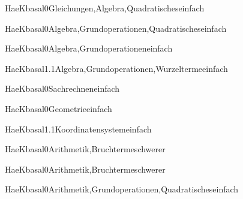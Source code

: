 \documentclass[12pt]{article}
\begin{document}
\begin{Add}{HaeK}{basal0}{Gleichungen,Algebra,Quadratisches}{einfach}
      
\end{Add}

\begin{Add}{HaeK}{basal0}{Algebra,Grundoperationen,Quadratisches}{einfach}
\end{Add}

\begin{Add}{HaeK}{basal0}{Algebra,Grundoperationen}{einfach}
\end{Add}

\begin{Add}{HaeK}{basal1.1}{Algebra,Grundoperationen,Wurzelterme}{einfach}
\end{Add}

\begin{Add}{HaeK}{basal0}{Sachrechnen}{einfach}
\end{Add}

\begin{Add}{HaeK}{basal0}{Geometrie}{einfach}
\end{Add}

\begin{Add}{HaeK}{basal1.1}{Koordinatensystem}{einfach}
\end{Add}

\begin{Add}{HaeK}{basal0}{Arithmetik,Bruchterme}{schwerer}
\end{Add}

\begin{Add}{HaeK}{basal0}{Arithmetik,Bruchterme}{schwerer}
\end{Add}

\begin{Add}{HaeK}{basal0}{Arithmetik,Grundoperationen,Quadratisches}{einfach}
\end{Add}
\end{document}
